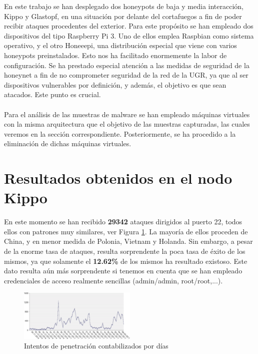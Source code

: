\documentclass[journal]{IEEEtran}
\begin{document}
En este trabajo se han desplegado dos honeypots de baja y media interacción, Kippo y Glastopf, en una situación por delante del cortafuegos a fin de poder recibir ataques procedentes del exterior. Para este propósito se han empleado dos dispositivos del tipo Raspberry Pi 3. Uno de ellos emplea Raspbian como sistema operativo, y el otro Honeeepi, una distribución especial que viene con varios honeypots preinstalados. Esto nos ha facilitado enormemente la labor de configuración. Se ha prestado especial atención a las medidas de seguridad de la honeynet a fin de no comprometer seguridad de la red de la UGR, ya que al ser dispositivos vulnerables por definición, y además, el objetivo es que sean atacados. Este punto es crucial.
\\\\
Para el análisis de las muestras de malware se han empleado máquinas virtuales con la misma arquitectura que el objetivo de las muestras capturadas, las cuales veremos en la sección correspondiente. Posteriormente, se ha procedido a la eliminación de dichas máquinas virtuales.


\section{Resultados obtenidos en el nodo Kippo}

En este momento se han recibido \textbf{29342} ataques dirigidos al puerto 22, todos ellos con patrones muy similares, ver Figura \ref{fig:pruebas_dia}. La mayoría de ellos proceden de China, y en menor medida de Polonia, Vietnam y Holanda. Sin embargo, a pesar de la enorme tasa de ataques, resulta sorprendente la poca tasa de éxito de los mismos, ya que solamente el \textbf{12.62\%} de los mismos ha resultado existoso. Este dato resulta aún más sorprendente si tenemos en cuenta que se han empleado credenciales de acceso realmente sencillas (admin/admin, root/root,...).

\begin{figure}[H]
\centering
\includegraphics[width=0.5\textwidth]{img/pruebas_dia}
\caption{Intentos de penetración contabilizados por días}
\label{fig:pruebas_dia}
\end{figure}
\end{document}

